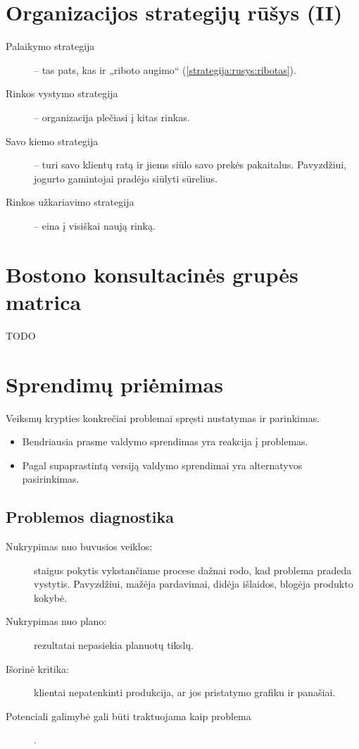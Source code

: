 \section{Organizacijos strategijų rūšys (II)}

\begin{description}
  \item[Palaikymo strategija] – tas pats, kas ir „riboto augimo“
    (\ref{strategija:rusys:ribotas}).
  \item[Rinkos vystymo strategija] – organizacija plečiasi į kitas
    rinkas. %
  \item[Savo kiemo strategija] – turi savo klientų ratą ir jiems
    siūlo savo prekės pakaitalus. Pavyzdžiui, jogurto gamintojai
    pradėjo siūlyti sūrelius. %
  \item[Rinkos užkariavimo strategija] – eina į visiškai naują rinką.
\end{description}

\section{Bostono konsultacinės grupės matrica}

TODO

\section{Sprendimų priėmimas}

\begin{defn}
  Veiksmų krypties konkrečiai problemai spręsti nustatymas ir parinkimas.
  \begin{itemize}
    \item Bendriausia prasme valdymo sprendimas yra reakcija į problemas.
    \item Pagal supaprastintą versiją valdymo sprendimai yra alternatyvos
      pasirinkimas.
  \end{itemize}
\end{defn}

\subsection{Problemos diagnostika}

\begin{description}
  \item[Nukrypimas nuo buvusios veiklos:] staigus pokytis
    vykstančiame procese dažnai rodo, kad problema pradeda vystytis.
    Pavyzdžiui, mažėja pardavimai, didėja išlaidos, blogėja produkto
    kokybė.
  \item[Nukrypimas nuo plano:] rezultatai nepasiekia planuotų
    tikslų.
  \item[Išorinė kritika:] klientai nepatenkinti produkcija, ar jos
    pristatymo grafiku ir panašiai.
  \item[Potenciali galimybė gali būti traktuojama kaip problema] .
\end{description}

